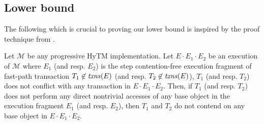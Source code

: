 \subsection{Lower bound}
%
The following which is crucial to proving our lower bound is inspired by the proof technique from \cite{htmdisc15}. 
%
\begin{lemma}
\label{lm:hytm}
%
Let $\mathcal{M}$ be any progressive HyTM implementation.
Let $E\cdot E_1 \cdot E_2$ be an execution of $\mathcal{M}$ where
$E_1$ (and resp. $E_2$) is the step contention-free
execution fragment of fast-path transaction $T_1 \not\in \ms{txns}(E)$ (and
resp. $T_2 \not\in \ms{txns}(E)$),
$T_1$ (and resp. $T_2$) does not conflict with any transaction in $E\cdot E_1 \cdot E_2$. 
Then, if $T_1$ (and resp. $T_2$) does not perform any direct nontrivial accesses of any base object in the execution fragment $E_1$ (and resp. $E_2$), then $T_1$ and $T_2$ do not contend on any base object in $E\cdot E_1 \cdot E_2$.
\end{lemma}
%
